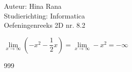 \documentclass[a4paper]{article}
\begin{document}
\noindent \large Auteur: Hina Rana \\
\noindent \large Studierichting: Informatica\\
\noindent \large Oefeningenreeks 2D nr. 8.2\\

\medskip

\normalsize
$\lim\limits_{x \to \infty} \left(-x^2 - \dfrac{1}{2}x\right) = \lim\limits_{x \to \infty} -x^2 = -\infty$

\begin{thebibliography}{999}

\end{thebibliography}
\end{document}
